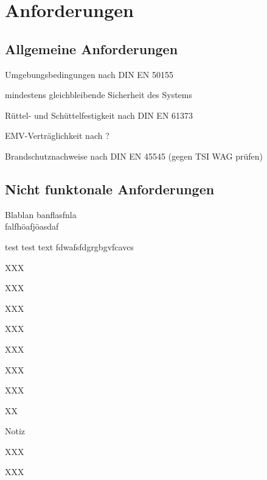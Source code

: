 \section{Anforderungen}
\subsection{Allgemeine Anforderungen}
\begin{feat}[Anf. X]
Umgebungsbedingungen nach DIN EN 50155
\end{feat}
\begin{feat}[Anf. X]
mindestens gleichbleibende Sicherheit des Systems
\end{feat}
\begin{feat}[Anf. X]
Rüttel- und Schüttelfestigkeit nach DIN EN 61373
\end{feat}
\begin{feat}
EMV-Verträglichkeit nach ?
\end{feat}
\begin{feat}
Brandschutznachweise nach DIN EN 45545 (gegen TSI WAG prüfen)
\end{feat}

\subsection{Nicht funktonale Anforderungen}
\begin{feat}[REQ. X]
Blablan
banflasfnla\\
falfhöafjöasdaf
\end{feat}
\begin{rem}[Notiz]
test test text fdwafsfdgrgbgvfcavcs
\end{rem}
\begin{feat}
XXX
\end{feat}
\begin{rem}
XXX
\end{rem}
\begin{feat}[REQ. 4]
XXX
\end{feat}
\begin{feat}[REQ. 4]
XXX
\end{feat}
\begin{feat}[REQ. 4]
XXX
\end{feat}
\begin{rem}
XXX
\end{rem}
\begin{feat}[REQ. 5]
XXX
\end{feat}
\begin{feat}[REQ. 6]
XX
\end{feat}
\begin{rem}
Notiz
\end{rem}
\begin{feat}[REQ. 7]
XXX
\end{feat}
\begin{feat}[REQ. 8]
XXX
\end{feat}

